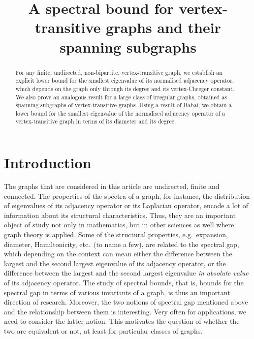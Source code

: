 \documentclass[ALCO,Unicode,published]{cedram}
\title[Spectral bound for transitive graphs and spanning subgraphs]
{A spectral bound for vertex-transitive graphs and their spanning subgraphs}
\author{\firstname{Arindam} \lastname{Biswas}}
\author{\firstname{Jyoti Prakash} \lastname{Saha}}
\begin{document}
\newtheorem{condition}[cdrthm]{Condition}

\begin{abstract}
For any finite, undirected, non-bipartite, vertex-transitive graph, we establish an explicit lower bound for the smallest eigenvalue of its normalised adjacency operator, which depends on the graph only through its degree and its vertex-Cheeger constant. We also prove an analogous result for a large class of irregular graphs, obtained as spanning subgraphs of vertex-transitive graphs. Using a result of Babai, we obtain a lower bound for the smallest eigenvalue of the normalised adjacency operator of a vertex-transitive graph in terms of its diameter and its degree. 
\end{abstract}

\maketitle


\section{Introduction}

The graphs that are considered in this article are undirected, finite and connected. The properties of the spectra of a graph, for instance, the distribution of eigenvalues of its adjacency operator or its Laplacian operator, encode a lot of information about its structural characteristics. Thus, they are an important object of study not only in mathematics, but in other sciences as well where graph theory is applied. Some of the structural properties, e.g.~expansion, diameter, Hamiltonicity, etc.~(to name a few), are related to the spectral gap, which depending on the context can mean either the difference between the largest and the second largest eigenvalue of its adjacency operator, or the difference between the largest and the second largest eigenvalue \emph{in absolute value} of its adjacency operator. The study of spectral bounds, that is, bounds for the spectral gap in terms of various invariants of a graph, is thus an important direction of research. Moreover, the two notions of spectral gap mentioned above and the relationship between them is interesting. Very often for applications, we need to consider the latter notion. This motivates the question of whether the two are equivalent or not, at least for particular classes of graphs.
\end{document}

